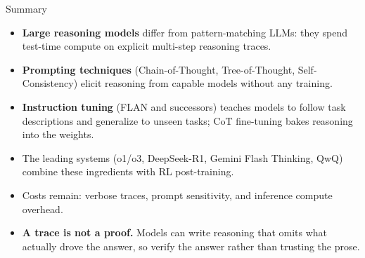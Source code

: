 \begin{frame}{Summary}
    \begin{itemize}\itemsep0.45em
      \item[\textcolor{red}{$\blacktriangleright$}] \textbf{Large reasoning models} differ from pattern-matching LLMs: they spend test-time compute on explicit multi-step reasoning traces.
      \item[\textcolor{red}{$\blacktriangleright$}] \textbf{Prompting techniques} (Chain-of-Thought, Tree-of-Thought, Self-Consistency) elicit reasoning from capable models without any training.
      \item[\textcolor{red}{$\blacktriangleright$}] \textbf{Instruction tuning} (FLAN and successors) teaches models to follow task descriptions and generalize to unseen tasks; CoT fine-tuning bakes reasoning into the weights.
      \item[\textcolor{red}{$\blacktriangleright$}] The leading systems (o1/o3, DeepSeek-R1, Gemini Flash Thinking, QwQ) combine these ingredients with RL post-training.
      \item[\textcolor{red}{$\blacktriangleright$}] Costs remain: verbose traces, prompt sensitivity, and inference compute overhead.
      \item[\textcolor{red}{$\blacktriangleright$}] \textbf{A trace is not a proof.} Models can write reasoning that omits what actually drove the answer, so verify the answer rather than trusting the prose.
    \end{itemize}
\end{frame}
